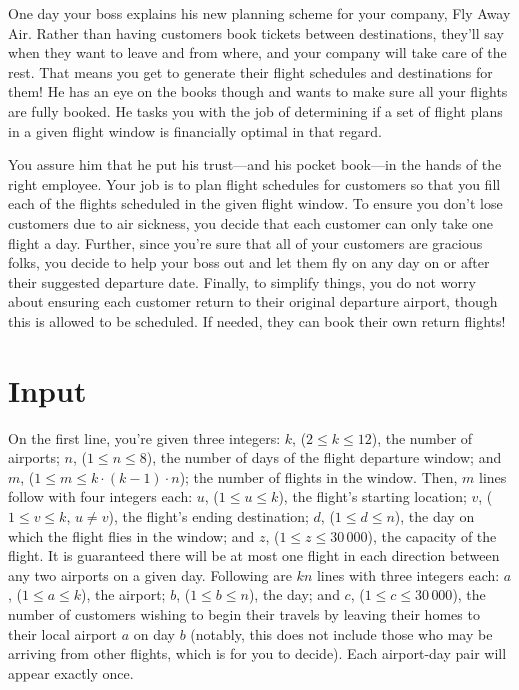 
One day your boss explains his new planning scheme for your company,
Fly Away Air. Rather than having customers book tickets between destinations,
they'll say when they want to leave and from where, and your company will take
care of the rest. That means you get to generate their flight schedules and destinations for
them! He has an eye on the books though and wants to make sure all your
flights are fully booked. He tasks you with the job of determining if a set of
flight plans in a given flight window is financially optimal in that regard.

You assure him that he put his trust---and his pocket book---in the hands of
the right employee. Your job is to plan flight schedules for customers so
that you fill each of the flights scheduled in the given flight window.
To ensure you don't lose customers due to air sickness,
you decide that each customer can only take one flight a day. Further,
since you're sure that all of your customers are gracious folks, you decide
to help your boss out and let them fly on any day on or after their suggested
departure date. Finally, to simplify things, you do not worry about ensuring each
customer return to their original departure airport, though this is allowed to be scheduled.
If needed, they can book their own return flights!

\section*{Input}

On the first line, you're given three integers: $k$, ($2 \leq k \leq 12$), the number of airports;
$n$, ($1 \leq n \leq 8$), the number of days of the flight departure window;
and $m$, ($1 \leq m \leq k\cdot (k-1) \cdot n$); the number of flights
in the window. Then, $m$ lines follow with four integers each: $u$, ($1 \leq u \leq k$), the flight's starting
location; $v$, ($1 \leq v \leq k$, $u \neq v$), the flight's ending destination; $d$, ($1 \leq d \leq n$), the day on which the
flight flies in the window; and $z$, ($1 \leq z \leq 30\,000$), the capacity of the flight.
It is guaranteed there will be at most one flight in each direction between any two airports on a given day.
Following are $kn$ lines with three integers each: $a$, ($1 \leq a \leq k$), the airport;
$b$, ($1 \leq b \leq n$), the day; and $c$, ($1 \leq c \leq 30\,000$), the number of customers
wishing to begin their travels by leaving their homes to their local airport $a$ on day $b$ (notably,
this does not include those who may be arriving from other flights, which is for you to decide). 
Each airport-day pair will appear exactly once.

